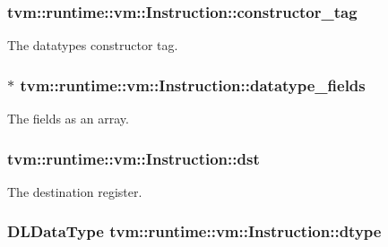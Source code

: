 \subsubsection[{\texorpdfstring{constructor\+\_\+tag}{constructor_tag}}]{ tvm\+::runtime\+::vm\+::\+Instruction\+::constructor\+\_\+tag}\hypertarget{structtvm_1_1runtime_1_1vm_1_1Instruction_a7349fa2a2e70149d4af08289c539150f}{}\label{structtvm_1_1runtime_1_1vm_1_1Instruction_a7349fa2a2e70149d4af08289c539150f}


The datatype\textquotesingle{}s constructor tag. 

\subsubsection[{\texorpdfstring{datatype\+\_\+fields}{datatype_fields}}]{$\ast$ tvm\+::runtime\+::vm\+::\+Instruction\+::datatype\+\_\+fields}\hypertarget{structtvm_1_1runtime_1_1vm_1_1Instruction_a25adb383014a74a9c4ac805beefe86b6}{}\label{structtvm_1_1runtime_1_1vm_1_1Instruction_a25adb383014a74a9c4ac805beefe86b6}


The fields as an array. 

\subsubsection[{\texorpdfstring{dst}{dst}}]{ tvm\+::runtime\+::vm\+::\+Instruction\+::dst}\hypertarget{structtvm_1_1runtime_1_1vm_1_1Instruction_a17f056cc4798d31c8bcee6903be8dd1d}{}\label{structtvm_1_1runtime_1_1vm_1_1Instruction_a17f056cc4798d31c8bcee6903be8dd1d}


The destination register. 

\subsubsection[{\texorpdfstring{dtype}{dtype}}]{\setlength{\rightskip}{0pt plus 5cm}D\+L\+Data\+Type tvm\+::runtime\+::vm\+::\+Instruction\+::dtype}\hypertarget{structtvm_1_1runtime_1_1vm_1_1Instruction_a91614b450055e58850c47949b3ed2714}{}\label{structtvm_1_1runtime_1_1vm_1_1Instruction_a91614b450055e58850c47949b3ed2714}


